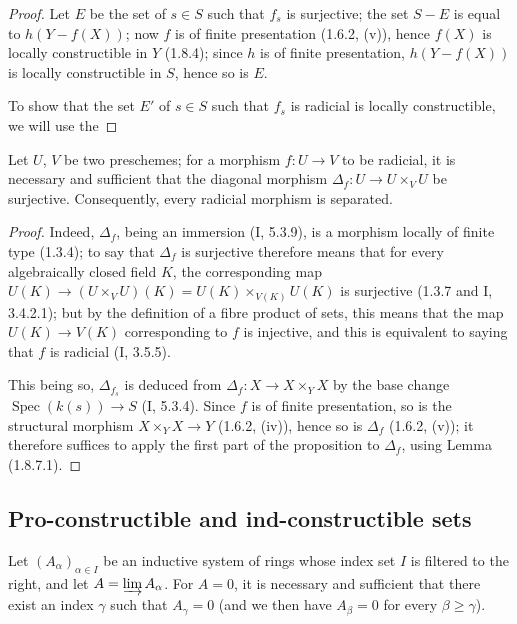 \begin{proof}
Let $E$ be the set of $s\in S$ such that $f_s$ is surjective; the set
$S-E$ is equal to $h(Y-f(X))$; now $f$ is of finite presentation
(1.6.2, (v)), hence $f(X)$ is locally constructible in $Y$ (1.8.4); since $h$
is of finite presentation, $h(Y-f(X))$ is locally constructible in $S$, hence
so is $E$.

To show that the set $E'$ of $s\in S$ such that $f_s$ is radicial
is locally constructible, we will use the
\end{proof}

\begin{lemma}[1.8.7.1]\label{IV.1.8.7.1}
Let $U$, $V$ be two preschemes; for a morphism $f:U\to V$ to be
radicial, it is necessary and sufficient that the diagonal morphism
$\Delta_f:U\to U\times_VU$ be surjective. Consequently, every radicial
morphism is separated.
\end{lemma}

\begin{proof}
Indeed, $\Delta_f$, being an immersion (I, 5.3.9), is a morphism
locally of finite type (1.3.4); to say that $\Delta_f$ is surjective
therefore means that for every algebraically closed field $K$, the
corresponding map $U(K)\to(U\times_VU)(K)=U(K)\times_{V(K)}U(K)$ is surjective
(1.3.7 and I, 3.4.2.1); but by the definition of a fibre product of sets,
this means that the map $U(K)\to V(K)$ corresponding to $f$ is
injective, and this is equivalent to saying that $f$ is radicial (I, 3.5.5).

This being so, $\Delta_{f_s}$ is deduced from $\Delta_f:X\to X\times_YX$ by
the base change $\operatorname{Spec}(k(s))\to S$ (I, 5.3.4). Since $f$
is of finite presentation, so is the structural morphism
$X\times_YX\to Y$ (1.6.2, (iv)), hence so is $\Delta_f$ (1.6.2, (v)); it
therefore suffices to apply the first part of the proposition to $\Delta_f$,
using Lemma (1.8.7.1).
\end{proof}


\subsection{Pro-constructible and ind-constructible sets}
\label{subsection:IV.1.9}

\begin{lemma}[1.9.1]
\label{IV.1.9.1}
Let $(A_\alpha)_{\alpha\in I}$ be an inductive system of rings whose index
set $I$ is filtered to the right, and let $A=\varinjlim A_\alpha$. For
$A=0$, it is necessary and sufficient that there exist an index $\gamma$ such
that $A_\gamma=0$ (and we then have $A_\beta=0$ for every $\beta\geq\gamma$).
\end{lemma}

